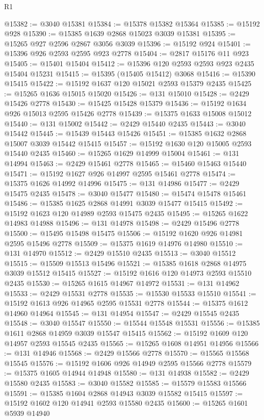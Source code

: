\begin{lexlean}{R1}
\begin{coremodule}
@15382 := @3040 @15381
@15384 := @15378 @15382 @15364
@15385 := @15192 @928
@15390 := @15385 @1639 @2868 @15023 @3039 @15381
@15395 := @15265 @927 @2596 @2867 @3056 @3039
@15396 := @15192 @924
@15401 := @15396 @926 @2593 @2595 @923 @2778
@15404 := @2817 @15176 @11 @923
@15405 := @15401 @15404
@15412 := @15396 @120 @2593 @2593 @923 @2435 @15404 @15231
@15415 := @15395 (@15405 @15412) @3068
@15416 := @15390 @15415
@15422 := @15192 @1637 @120 @15021 @2593 @15379 @2435
@15425 := @15265 @1636 @15015 @15020
@15426 := @131 @15010
@15428 := @2429 @15426 @2778
@15430 := @15425 @15428 @15379
@15436 := @15192 @1634 @926 @15013 @2595 @15426 @2778
@15439 := @15375 @1633 @15008 @15012
@15440 := @131 @15002
@15442 := @2429 @15440 @2435
@15443 := @3040 @15442
@15445 := @15439 @15443 @15426
@15451 := @15385 @1632 @2868 @15007 @3039 @15442 @15415
@15457 := @15192 @1630 @120 @15005 @2593 @15440 @2435
@15460 := @15265 @1629 @14999 @15004
@15461 := @131 @14994
@15463 := @2429 @15461 @2778
@15465 := @15460 @15463 @15440
@15471 := @15192 @1627 @926 @14997 @2595 @15461 @2778
@15474 := @15375 @1626 @14992 @14996
@15475 := @131 @14986
@15477 := @2429 @15475 @2435
@15478 := @3040 @15477
@15480 := @15474 @15478 @15461
@15486 := @15385 @1625 @2868 @14991 @3039 @15477 @15415
@15492 := @15192 @1623 @120 @14989 @2593 @15475 @2435
@15495 := @15265 @1622 @14983 @14988
@15496 := @131 @14978
@15498 := @2429 @15496 @2778
@15500 := @15495 @15498 @15475
@15506 := @15192 @1620 @926 @14981 @2595 @15496 @2778
@15509 := @15375 @1619 @14976 @14980
@15510 := @131 @14970
@15512 := @2429 @15510 @2435
@15513 := @3040 @15512
@15515 := @15509 @15513 @15496
@15521 := @15385 @1618 @2868 @14975 @3039 @15512 @15415
@15527 := @15192 @1616 @120 @14973 @2593 @15510 @2435
@15530 := @15265 @1615 @14967 @14972
@15531 := @131 @14962
@15533 := @2429 @15531 @2778
@15535 := @15530 @15533 @15510
@15541 := @15192 @1613 @926 @14965 @2595 @15531 @2778
@15544 := @15375 @1612 @14960 @14964
@15545 := @131 @14954
@15547 := @2429 @15545 @2435
@15548 := @3040 @15547
@15550 := @15544 @15548 @15531
@15556 := @15385 @1611 @2868 @14959 @3039 @15547 @15415
@15562 := @15192 @1609 @120 @14957 @2593 @15545 @2435
@15565 := @15265 @1608 @14951 @14956
@15566 := @131 @14946
@15568 := @2429 @15566 @2778
@15570 := @15565 @15568 @15545
@15576 := @15192 @1606 @926 @14949 @2595 @15566 @2778
@15579 := @15375 @1605 @14944 @14948
@15580 := @131 @14938
@15582 := @2429 @15580 @2435
@15583 := @3040 @15582
@15585 := @15579 @15583 @15566
@15591 := @15385 @1604 @2868 @14943 @3039 @15582 @15415
@15597 := @15192 @1602 @120 @14941 @2593 @15580 @2435
@15600 := @15265 @1601 @5939 @14940

\end{coremodule}
\end{lexlean}
